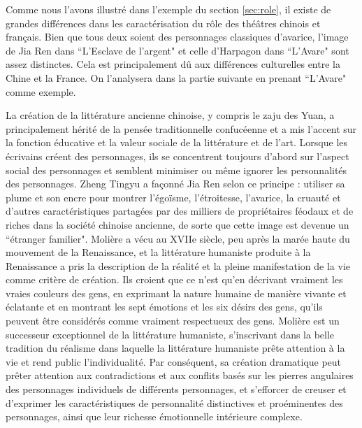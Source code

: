 \documentclass[UTF8,a4paper,12pt]{ctexart}
\numberwithin{equation}{section}
\begin{document}
Comme nous l'avons illustré dans l'exemple du section \ref{sec:role}, il existe de grandes différences dans les caractérisation du rôle des théâtres chinois et français. Bien que tous deux soient des personnages classiques d'avarice, l'image de Jia Ren dans ``L'Esclave de l'argent" et celle d'Harpagon dans ``L'Avare" sont assez distinctes. Cela est principalement dû aux différences culturelles entre la Chine et la France. On l'analysera dans la partie suivante en prenant ``L'Avare" comme exemple.



La création de la littérature ancienne chinoise, y compris le zaju des Yuan, a principalement hérité de la pensée traditionnelle confucéenne et a mis l'accent sur la fonction éducative et la valeur sociale de la littérature et de l'art. Lorsque les écrivains créent des personnages, ils se concentrent toujours d'abord sur l'aspect social des personnages et semblent minimiser ou même ignorer les personnalités des personnages. Zheng Tingyu a façonné Jia Ren selon ce principe : utiliser sa plume et son encre pour montrer l'égoïsme, l'étroitesse, l'avarice, la cruauté et d'autres caractéristiques partagées par des milliers de propriétaires féodaux et de riches dans la société chinoise ancienne, de sorte que cette image est devenue un ``étranger familier". Molière a vécu au XVIIe siècle, peu après la marée haute du mouvement de la Renaissance, et la littérature humaniste produite à la Renaissance a pris la description de la réalité et la pleine manifestation de la vie comme critère de création. Ils croient que ce n'est qu'en décrivant vraiment les vraies couleurs des gens, en exprimant la nature humaine de manière vivante et éclatante et en montrant les sept émotions et les six désirs des gens, qu'ils peuvent être considérés comme vraiment respectueux des gens. Molière est un successeur exceptionnel de la littérature humaniste, s'inscrivant dans la belle tradition du réalisme dans laquelle la littérature humaniste prête attention à la vie et rend public l'individualité. Par conséquent, sa création dramatique peut prêter attention aux contradictions et aux conflits basés sur les pierres angulaires des personnages individuels de différents personnages, et s'efforcer de creuser et d'exprimer les caractéristiques de personnalité distinctives et proéminentes des personnages, ainsi que leur richesse émotionnelle intérieure complexe.
\end{document}
